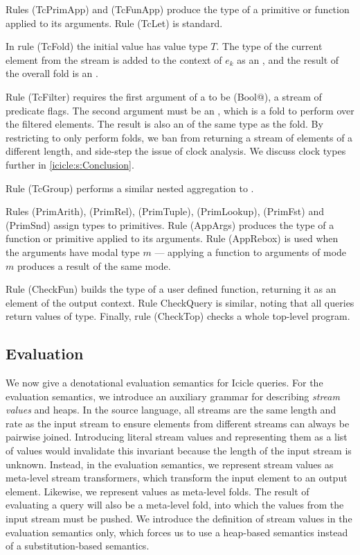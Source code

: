 Rules (TcPrimApp) and (TcFunApp) produce the type of a primitive or function applied to its arguments. Rule (TcLet) is standard.

In rule (TcFold) the initial value has value type $T$. The type of the current element from the stream is added to the context of $e_k$ as an \Ic@Element@, and the result of the overall fold is an \Ic@Aggregate@.

Rule (TcFilter) requires the first argument of a \Ic@filter@ to be (\Ic@Element Bool@), a stream of predicate flags.
The second argument must be an \Ic@Aggregate@, which is a fold to perform over the filtered elements.
The result is also an \Ic@Aggregate@ of the same type as the fold.
By restricting \Ic@filter@ to only perform folds, we ban \Ic@filter@ from returning a stream of elements of a different length, and side-step the issue of clock analysis.
We discuss clock types further in \cref{icicle:s:Conclusion}.

Rule (TcGroup) performs a similar nested aggregation to \Ic@filter@.

Rules (PrimArith), (PrimRel), (PrimTuple), (PrimLookup), (PrimFst) and (PrimSnd) assign types to primitives.
Rule (AppArgs) produces the type of a function or primitive applied to its arguments.
Rule (AppRebox) is used when the arguments have modal type $m$ --- applying a function to arguments of mode $m$ produces a result of the same mode.

Rule (CheckFun) builds the type of a user defined function, returning it as an element of the output context. Rule CheckQuery is similar, noting that all queries return values of \Ic@Aggregate@ type. Finally, rule (CheckTop) checks a whole top-level program.


\subsection{Evaluation}

We now give a denotational evaluation semantics for Icicle queries.
For the evaluation semantics, we introduce an auxiliary grammar for describing \emph{stream values} and heaps.
In the source language, all streams are the same length and rate as the input stream to ensure elements from different streams can always be pairwise joined.
Introducing literal stream values and representing them as a list of values would invalidate this invariant because the length of the input stream is unknown.
Instead, in the evaluation semantics, we represent \Ic@Element@ stream values as meta-level stream transformers, which transform the input element to an output element.
Likewise, we represent \Ic@Aggregate@ values as meta-level folds.
The result of evaluating a query will also be a meta-level fold, into which the values from the input stream must be pushed.
We introduce the definition of stream values in the evaluation semantics only, which forces us to use a heap-based semantics instead of a substitution-based semantics.

